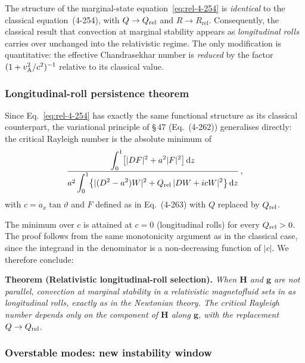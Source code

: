 \begin{relcorrection}
The structure of the marginal-state equation~\eqref{eq:rel-4-254} is
\emph{identical} to the classical equation~(4-254), with
$Q\to Q_{\mathrm{rel}}$ and $R\to R_{\mathrm{rel}}$.  Consequently, the classical
result that convection at marginal stability appears as
\emph{longitudinal rolls} carries over unchanged into the relativistic
regime.  The only modification is quantitative: the effective
Chandrasekhar number is \emph{reduced} by the factor
$(1 + v_{\mathrm{A}}^{2}/c^{2})^{-1}$ relative to its classical value.
\end{relcorrection}

\subsubsection{Longitudinal-roll persistence theorem}

Since Eq.~\eqref{eq:rel-4-254} has exactly the same functional
structure as its classical counterpart, the variational principle of
\S\,47 (Eq.~(4-262)) generalises directly: the critical Rayleigh number
is the absolute minimum of
\begin{equation}
  \frac{\displaystyle\int_{0}^{1}
        \bigl[|DF|^{2} + a^{2}|F|^{2}\bigr]\,\mathrm{d} z}
       {a^{2}\displaystyle\int_{0}^{1}
        \bigl\{|(D^{2}-a^{2})W|^{2}
              + Q_{\mathrm{rel}}\,|DW + icW|^{2}\bigr\}\,\mathrm{d} z}\,,
  \label{eq:rel-variational-oblique}
\end{equation}
with $c = a_{x}\tan\vartheta$ and $F$ defined as in Eq.~(4-263) with
$Q$ replaced by $Q_{\mathrm{rel}}$.

The minimum over $c$ is attained at $c = 0$ (longitudinal rolls) for
every $Q_{\mathrm{rel}} > 0$.  The proof follows from the same monotonicity
argument as in the classical case, since the integrand in the
denominator is a non-decreasing function of $|c|$.  We therefore
conclude:

\medskip
\noindent\textbf{Theorem (Relativistic longitudinal-roll selection).}
\emph{When $\mathbf{H}$ and $\mathbf{g}$ are not parallel, convection
at marginal stability in a relativistic magnetofluid sets in as
longitudinal rolls, exactly as in the Newtonian theory.  The critical
Rayleigh number depends only on the component of $\mathbf{H}$ along
$\mathbf{g}$, with the replacement $Q\to Q_{\mathrm{rel}}$.}

\subsubsection{Overstable modes: new instability window}

